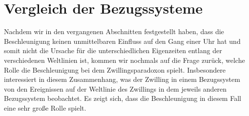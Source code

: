 \section{Vergleich der Bezugssysteme}

Nachdem wir in den vergangenen Abschnitten festgestellt haben, dass die Beschleunigung
keinen unmittelbaren Einfluss auf den Gang einer Uhr hat und somit nicht die Ursache
f\"ur die unterschiedlichen Eigenzeiten entlang der verschiedenen Weltlinien ist, kommen wir
nochmals auf die Frage zur\"uck, welche Rolle die Beschleunigung bei dem Zwillingsparadoxon
spielt. Insbesondere interessiert in diesem Zusammenhang, was der Zwilling in einem
Bezugssystem von den Ereignissen auf der Weltlinie des Zwillings in dem jeweils anderen 
Bezugssystem beobachtet. Es zeigt sich, dass die Beschleunigung in diesem Fall eine sehr 
gro\ss e Rolle spielt. 

